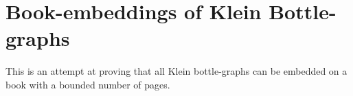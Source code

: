 \section{Book-embeddings of Klein Bottle-graphs}

This is an attempt at proving that all Klein bottle-graphs can be embedded on a book with a bounded number of pages.


